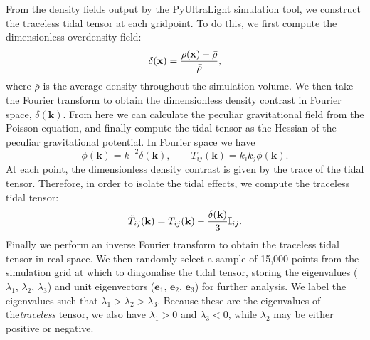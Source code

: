 \documentclass[a4paper,11pt]{article}
\begin{document}
From the density fields output by the {\sc PyUltraLight} simulation tool, we construct the traceless tidal tensor at each gridpoint. To do this, we first compute the dimensionless overdensity field:
\begin{equation}
    \delta(\mathrm{\mathbf{x}}) = \frac{\rho(\mathrm{\mathbf{x}})-\Bar{\rho}}{\bar{\rho}}, 
\end{equation}
where $\bar{\rho}$ is the average density throughout the simulation volume. We then take the Fourier transform to obtain the dimensionless density contrast in Fourier space, $\delta(\mathrm{\mathbf{k}})$. From here we can calculate the peculiar gravitational field from the Poisson equation, and finally compute the tidal tensor as the Hessian of the peculiar gravitational potential. In Fourier space we have
\begin{equation}
    \phi(\mathrm{\mathbf{k}}) = k^{-2}\delta(\mathrm{\mathbf{k}}), \qquad T_{ij}(\mathrm{\mathbf{k}}) = k_{i}k_{j}\phi(\mathrm{\mathbf{k}}).
\end{equation}
At each point, the dimensionless density contrast is given by the trace of the tidal tensor. Therefore, in order to isolate the tidal effects, we compute the traceless tidal tensor:
\begin{equation}
    \Tilde{T}_{ij}(\mathrm{\mathbf{k}}) = T_{ij}(\mathrm{\mathbf{k}}) - \frac{\delta(\mathrm{\mathbf{k}})}{3}\mathbb{I}_{ij}.
\end{equation}
Finally we perform an inverse Fourier transform to obtain the traceless tidal tensor in real space. We then randomly select a sample of 15,000 points from the simulation grid at which to diagonalise the tidal tensor, storing the eigenvalues ($\lambda_1$, $\lambda_2$, $\lambda_3$) and unit eigenvectors ($\mathrm{\mathbf{e}}_1$, $\mathrm{\mathbf{e}}_2$, $\mathrm{\mathbf{e}}_3$) for further analysis. We label the eigenvalues such that $\lambda_1 >\lambda_2 > \lambda_3$. Because these are the eigenvalues of the\textit{traceless} tensor, we also have $\lambda_1>0$ and  $\lambda_3 < 0$, while $\lambda_2$ may be either positive or negative.
\end{document}
